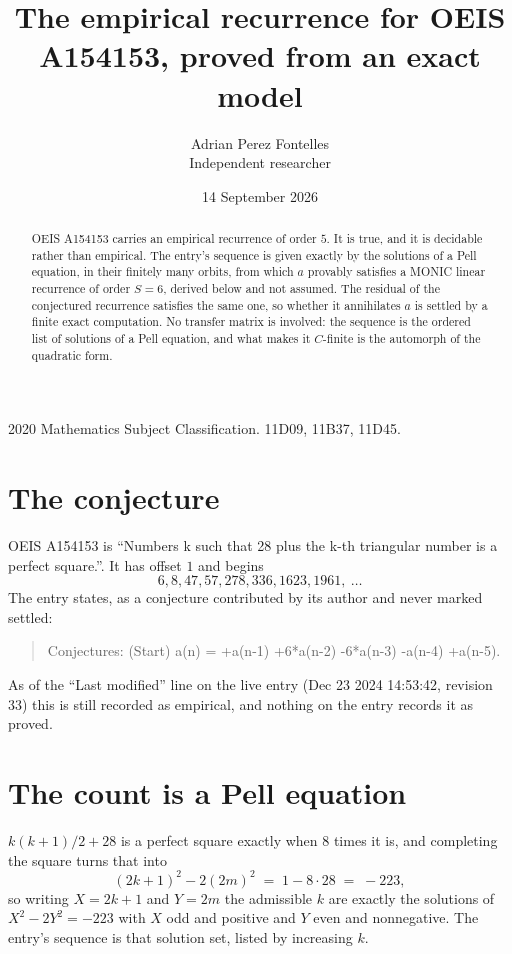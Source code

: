 \documentclass[11pt,a4paper]{article}
\title{The empirical recurrence for OEIS A154153, proved from an exact model}
\author{Adrian Perez Fontelles\\ \small Independent researcher}
\date{14 September 2026}
\theoremstyle{plain}
\theoremstyle{definition}
\begin{document}
\maketitle

\begin{abstract}
OEIS A154153 carries an empirical recurrence of order $5$. It is true, and it is
decidable rather than empirical. The entry's sequence is given exactly by the solutions of a Pell equation, in their finitely many orbits, from
which $a$ provably satisfies a MONIC linear recurrence of order $S=6$, derived below and not
assumed. The residual of the conjectured recurrence satisfies the same one, so whether it
annihilates $a$ is settled by a finite exact computation. No transfer matrix is involved: the sequence is the ordered list of solutions of a Pell equation, and what makes it $C$-finite is the automorph of the quadratic form.
\end{abstract}

\noindent\small 2020 Mathematics Subject Classification. 11D09, 11B37, 11D45.\normalsize

\section{The conjecture}

OEIS A154153 is ``Numbers k such that 28 plus the k-th triangular number is a perfect square.''. It has offset $1$ and begins
\[
6, 8, 47, 57, 278, 336, 1623, 1961,\ \dots
\]
The entry states, as a conjecture contributed by its author and never marked settled:
\begin{quote}
Conjectures: (Start) a(n) = +a(n-1) +6*a(n-2) -6*a(n-3) -a(n-4) +a(n-5).
\end{quote}
As of the ``Last modified'' line on the live entry (Dec 23 2024 14:53:42, revision 33)
this is still recorded as empirical, and nothing on the entry records it as proved.

\section{The count is a Pell equation}

$k(k+1)/2 + 28$ is a perfect square exactly when $8$ times it is, and completing the square
turns that into
\[
(2k+1)^2-2(2m)^2\;=\;1-8\cdot28\;=\;-223,
\]
so writing $X=2k+1$ and $Y=2m$ the admissible $k$ are exactly the solutions of $X^2-2Y^2=-223$
with $X$ odd and positive and $Y$ even and nonnegative. The entry's sequence is that solution
set, listed by increasing $k$.
\end{document}
